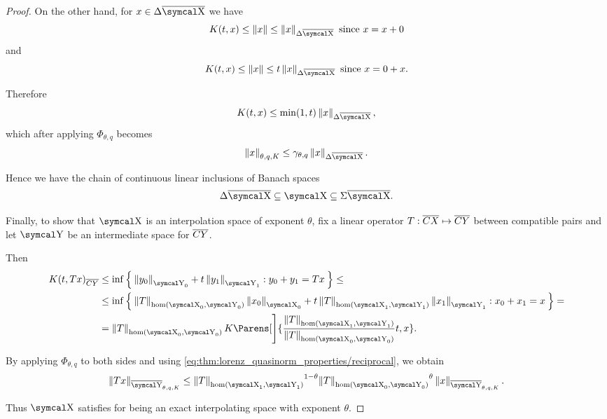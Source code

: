 \begin{proof}
  On the other hand, for \( x \in \Delta \Ol{\CX} \) we have
  \begin{equation*}
    K(t, x) \leq \Norm{x} \leq \Norm{x}_{\Delta \Ol{\CX}} \T{since} x = x + 0
  \end{equation*}
  and
  \begin{equation*}
    K(t, x) \leq \Norm{x} \leq t \Norm{x}_{\Delta \Ol{\CX}} \T{since} x = 0 + x.
  \end{equation*}

  Therefore
  \begin{equation*}
    K(t, x) \leq \min(1, t) \Norm{x}_{\Delta \Ol{\CX}},
  \end{equation*}
  which after applying \( \Phi_{\theta,q} \) becomes
  \begin{equation*}
    \Norm{x}_{\theta,q,K} \leq \gamma_{\theta,q} \Norm{x}_{\Delta \Ol{\CX}}.
  \end{equation*}

  Hence we have the chain of continuous linear inclusions of Banach spaces
  \begin{equation*}
    \Delta \Ol{\CX} \subseteq \CX \subseteq \Sigma \Ol{\CX}.
  \end{equation*}

  Finally, to show that \( \CX \) is an interpolation space of exponent \( \theta \), fix a linear operator \( T: \overline{CX} \mapsto \overline{CY} \) between compatible pairs and let \( \CY \) be an intermediate space for \( \overline{CY} \).

  Then
  \begin{align*}
    K(t, Tx)_{\Ol{CY}}
    &\leq
    \inf \Set{ \Norm{y_0}_{\CY_0} + t \Norm{y_1}_{\CY_1} : y_0 + y_1 = Tx }
    \leq \\ &\leq
    \inf \Set{ \Norm{T}_{\hom(\CX_0, \CY_0)} \Norm{x_0}_{\CX_0} + t \Norm{T}_{\hom(\CX_1, \CY_1)} \Norm{x_1}_{\CY_1} : x_0 + x_1 = x }
    = \\ &=
    \Norm{T}_{\hom(\CX_0, \CY_0)} K\Parens[\Bigg]{\frac {\Norm{T}_{\hom(\CX_1, \CY_1)}} {\Norm{T}_{\hom(\CX_0, \CY_0)}} t, x}.
  \end{align*}

  By applying \( \Phi_{\theta,q} \) to both sides and using \eqref{eq:thm:lorenz_quasinorm_properties/reciprocal}, we obtain
  \begin{equation*}
    \Norm{Tx}_{\Ol{\CY}_{\theta,q,K}}
    \leq
    {\Norm{T}_{\hom(\CX_1, \CY_1)}}^{1 - \theta} {\Norm{T}_{\hom(\CX_0, \CY_0)}}^{\theta} \Norm{x}_{\Ol{\CY}_{\theta,q,K}}.
  \end{equation*}

  Thus \( \CX \) satisfies  for being an exact interpolating space with exponent \( \theta \).
\end{proof}

